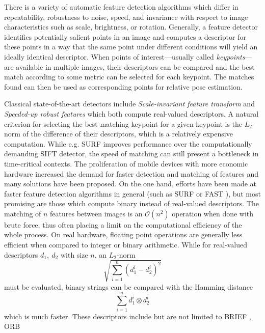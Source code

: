 There is a variety of automatic feature detection algorithms which differ in
repeatability, robustness to noise, speed, and invariance with respect to image
characteristics such as scale, brightness, or rotation. 
Generally, a feature detector identifies potentially salient points in an image
and computes a descriptor for these points in a way that the same point under
different conditions will yield an ideally identical descriptor. When points of
interest---usually called \emph{keypoints}---are available in multiple images,
their descriptors can be compared and the best match according to some metric
can be selected for each keypoint. The matches found can then be used as
corresponding points for relative pose estimation.

Classical state-of-the-art detectors include \emph{Scale-invariant feature
transform} \citep{lowe1999} and \emph{Speeded-up robust features}
\citep{bay2006} which both compute real-valued descriptors. A natural criterion
for selecting the best matching keypoint for a given keypoint is the $L_2$-norm
of the difference of their descriptors, which is a relatively expensive
computation. While e.g. SURF improves performance over the computationally
demanding SIFT detector, the speed of matching can still present a bottleneck in
time-critical contexts. The proliferation of mobile devices with more economic
hardware increased the demand for faster detection and matching of features and
many solutions have been proposed. On the one hand, efforts have been made at
faster feature detection algorithms in general (such as SURF or FAST
\citep{rosten2005}), but most promising are those which compute binary instead
of real-valued descriptors. The matching of $n$ features between images is an
$\mathcal{O}(n^2)$ operation when done with brute force, thus often placing a
limit on the computational efficiency of the whole process. On real hardware,
floating point operations are generally less efficient when compared to integer
or binary arithmetic. While for real-valued descriptors $d_1,~d_2$ with size $n$,
an $L_2$-norm 
\begin{equation*}
   \sqrt{\sum_{i=1}^n (d_1^i - d_2^i)^2}
\end{equation*}
must be evaluated,
binary strings can be compared with the Hamming distance 
\begin{equation*}
   \sum_{i=1}^n d_1^i \otimes d_2^i   
\end{equation*}
which is much faster. These descriptors include but are not limited to BRIEF
\citep[Binary Robust Independent Elementary Features]{calonder2010}, ORB
